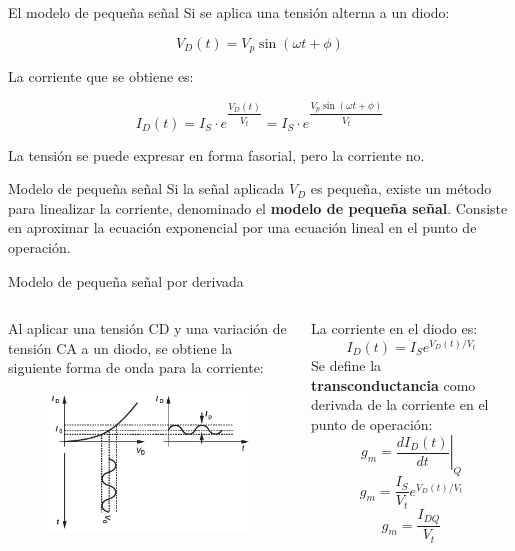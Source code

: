 \documentclass[t,aspectratio=169]{beamer}
\begin{document}
\begin{frame}{El modelo de pequeña señal}
    Si se aplica una tensión alterna a un diodo:

    \[ V_D(t) = V_p \sin(\omega t + \phi) \]
    
    La corriente que se obtiene es:

    \[ I_D(t) = I_S \cdot e^{\dfrac{V_D(t)}{V_t}} =  I_S \cdot e^{\dfrac{ V_p \sin(\omega t + \phi) }{V_t}}  \]

    La tensión se puede expresar en forma fasorial, pero la corriente no.

    \begin{block}{Modelo de pequeña señal}
    Si la señal aplicada $V_D$ es pequeña, existe un método para linealizar la corriente, denominado el \textbf{modelo de pequeña señal}. Consiste en aproximar la ecuación exponencial por una ecuación lineal en el punto de operación. 
    \end{block}
\end{frame}


\begin{frame}{Modelo de pequeña señal por derivada}
\begin{columns}
\begin{column}{0.5\textwidth}
    Al aplicar una tensión CD y una variación de tensión CA a un diodo, se obtiene la siguiente forma de onda para la corriente:
    
    \begin{figure}
        \centering
        \includegraphics[width=\textwidth]{figures/diode_small_signal.png}
    \end{figure}
\end{column}
\begin{column}{0.5\textwidth}
    La corriente en el diodo es:
    \[ I_D(t) = I_S e^{V_D(t)/V_t} \]
    Se define la \textbf{transconductancia} como derivada de la corriente en el punto de operación:
    \[ g_m = \left. \dfrac{dI_D(t)}{dt} \right|_Q \]
    \[ g_m = \dfrac{I_S}{V_t} e^{V_D(t)/V_t} \]
    \[ g_m = \dfrac{I_{DQ}}{V_t} \]
\end{column}
\end{columns}
\end{frame}
\end{document}

